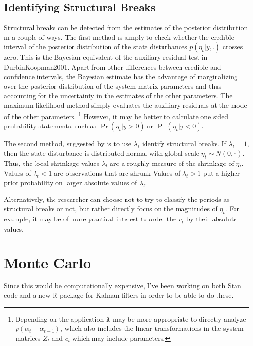 \documentclass{article}
\begin{document}
\subsection{Identifying Structural Breaks}

Structural breaks can be detected from the estimates of the  posterior distribution in a couple of ways.
The first method is simply to check whether the credible interval of the posterior distribution of the state disturbances $p(\eta_{t} | y, .)$ crosses zero.
This is the Bayesian equivalent of the auxiliary residual test in \textcite{JongPenzer1998}{DurbinKoopman2001}.%
Apart from other differences between credible and confidence intervals, the Bayesian estimate has the advantage of marginalizing over the posterior distribution of the system matrix parameters and thus accounting for the  uncertainty in the estimates of the other parameters.
The maximum likelihood method simply evaluates the auxiliary residuals at the mode of the other parameters.%
\footnote{Depending on the application it may be more appropriate to directly analyze $p(\alpha_{t} - \alpha_{t-1})$, which also includes the linear transformations in the system matrices $Z_{t}$ and $c_{t}$ which may include parameters.}
However, it may be better to calculate one sided probability statements, such as $\Pr(\eta_{t} | y > 0)$ or $\Pr(\eta_{t} | y <0)$.

The second method, suggested by \textcite[179-180]{PetrisPetroneEtAl2009} is to use $\lambda_{t}$ identify structural breaks.
If $\lambda_{t} = 1$, then the state disturbance is distributed normal with global scale $\eta_{t} \sim N(0, \tau)$.
Thus, the local shrinkage values $\lambda_{t}$ are a roughly measure of the shrinkage of $\eta_{t}$.
Values of $\lambda_{t} < 1$ are observations that are shrunk
Values of $\lambda_{t} > 1$ put a higher prior probability on larger absolute values of $\lambda_{t}$.

Alternatively, the researcher can choose not to try to classify the periods as structural breaks or not, but rather directly focus on the magnitudes of $\eta_{t}$.
For example, it may be of more practical interest to order the $\eta_{t}$ by their absolute values.

\section{Monte Carlo}
\label{sec:monte-carlo}

Since this would be computationally expensive, I've been working on both Stan code and a new R package for Kalman filters in order to be able to do these.
\end{document}
